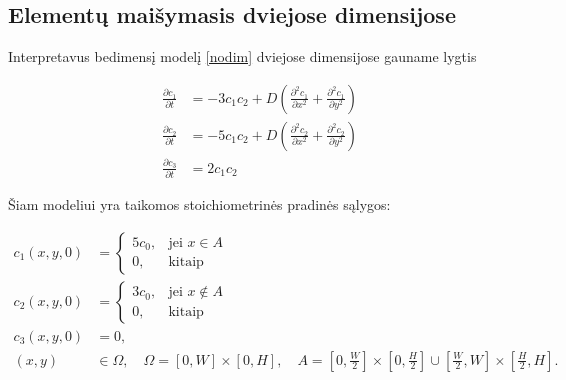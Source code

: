 \documentclass{VUMIFInfKursinis}
\begin{document}
\subsection{Elementų maišymasis dviejose dimensijose}

Interpretavus bedimensį modelį \eqref{nodim} dviejose dimensijose gauname lygtis

\begin{subequations} \label{rect}
    \begin{align}
    \frac{\partial c_1}{\partial t}&=-3c_1c_2+D\left(\frac{\partial^2c_1}{\partial x^2}+\frac{\partial^2c_1}{\partial y^2}\right)\\
    \frac{\partial c_2}{\partial t}&=-5c_1c_2+D\left(\frac{\partial^2c_2}{\partial x^2}+\frac{\partial^2c_2}{\partial y^2}\right)\\
    \frac{\partial c_3}{\partial t}&=2c_1c_2
    \end{align}
\end{subequations}

\newpage
Šiam modeliui yra taikomos stoichiometrinės pradinės sąlygos:


\begin{equation} \label{intial-cond}
  \begin{aligned}
  c_1(x, y, 0) &= \begin{cases} 5c_0, & \text{jei } x \in A \\ 0, & \text{kitaip} \end{cases}\\
  c_2(x, y, 0) &= \begin{cases} 3c_0, & \text{jei } x \notin A \\ 0, & \text{kitaip} \end{cases}\\
  c_3(x, y, 0) &= 0,\\ 
  (x, y) &\in \Omega, \quad\Omega=[0,W]\times[0,H],\quad A=\left[0,\tfrac{W}{2}\right]\times\left[0,\tfrac{H}{2}\right] \cup \left[\tfrac{W}{2},W\right]\times\left[\tfrac{H}{2},H\right].
\end{aligned}
\end{equation}
\end{document}
